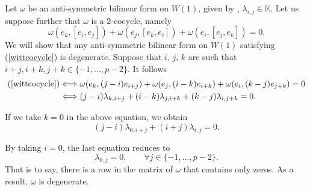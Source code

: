 \documentclass[pdftex]{sigma}
\numberwithin{equation}{section}
\begin{document}
Let $\omega$ be an anti-symmetric bilinear form on $W(1)$, given by , $\lambda_{i,j}\in\mathbb{K}$. Let us suppose further that $\omega$ is a $2$-cocycle, namely
\begin{equation}\label{wittcocycle}
 \omega(e_k,[e_i,e_j])+\omega(e_j,[e_k,e_i])+\omega(e_i,[e_j,e_k])=0.
\end{equation}
We will show that any anti-symmetric bilinear form on $W(1)$ satisfying (\ref{wittcocycle}) is degenerate. Suppose that $i$, $j$, $k$ are such that $i+j, i+k, j+k \in\{-1,\dots ,p-2\}.$ It follows
\begin{align*}
(\ref{wittcocycle})&\Longleftrightarrow \omega(e_k,(j-i)e_{i+j})+ \omega(e_j,(i-k)e_{i+k})+ \omega(e_i,(k-j)e_{j+k})=0\\
 &\Longleftrightarrow (j-i)\lambda_{k,i+j}+(i-k)\lambda_{j,i+k}+(k-j)\lambda_{i,j+k}=0.
\end{align*}

If we take $k=0$ in the above equation, we obtain
\[
 (j-i)\lambda_{0,i+j}+(i+j)\lambda_{i,j}=0.
\]

By taking $i=0$, the last equation reduces to
\[
 \lambda_{0,j}=0,\qquad \forall j\in\{-1,\dots ,p-2\}.
\]
That is to say, there is a row in the matrix of $\omega$ that contains only zeros. As a result, $\omega$ is degenerate.
\end{document}
